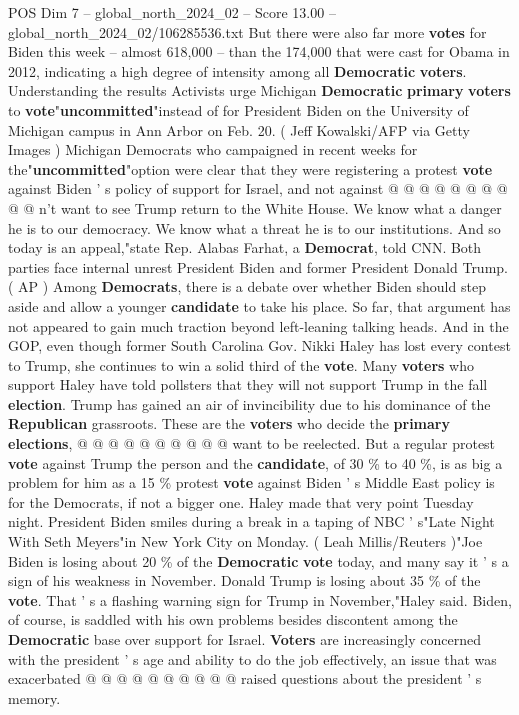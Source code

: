 \begin{textsample}{POS Dim 7 – global\_north\_2024\_02 – Score 13.00 – global\_north\_2024\_02/106285536.txt}
But there were also far more \textbf{votes} for Biden this week -- almost 618,000 -- than the 174,000 that were cast for Obama in 2012, indicating a high degree of intensity among all \textbf{Democratic} \textbf{voters}.
Understanding the results Activists urge Michigan \textbf{Democratic} \textbf{primary} \textbf{voters} to \textbf{vote}"\textbf{uncommitted}"instead of for President Biden on the University of Michigan campus in Ann Arbor on Feb. 20. ( Jeff Kowalski/AFP via Getty Images ) Michigan Democrats who campaigned in recent weeks for the"\textbf{uncommitted}"option were clear that they were registering a protest \textbf{vote} against Biden ' s policy of support for Israel, and not against @ @ @ @ @ @ @ @ @ @ n't want to see Trump return to the White House.
We know what a danger he is to our democracy.
We know what a threat he is to our institutions.
And so today is an appeal,"state Rep.
Alabas Farhat, a \textbf{Democrat}, told CNN.
Both parties face internal unrest President Biden and former President Donald Trump. ( AP ) Among \textbf{Democrats}, there is a debate over whether Biden should step aside and allow a younger \textbf{candidate} to take his place.
So far, that argument has not appeared to gain much traction beyond left-leaning talking heads.
And in the GOP, even though former South Carolina Gov.
Nikki Haley has lost every contest to Trump, she continues to win a solid third of the \textbf{vote}.
Many \textbf{voters} who support Haley have told pollsters that they will not support Trump in the fall \textbf{election}.
Trump has gained an air of invincibility due to his dominance of the \textbf{Republican} grassroots.
These are the \textbf{voters} who decide the \textbf{primary} \textbf{elections}, @ @ @ @ @ @ @ @ @ @ want to be reelected.
But a regular protest \textbf{vote} against Trump the person and the \textbf{candidate}, of 30 \% to 40 \%, is as big a problem for him as a 15 \% protest \textbf{vote} against Biden ' s Middle East policy is for the Democrats, if not a bigger one.
Haley made that very point Tuesday night.
President Biden smiles during a break in a taping of NBC ' s"Late Night With Seth Meyers"in New York City on Monday. ( Leah Millis/Reuters )"Joe Biden is losing about 20 \% of the \textbf{Democratic} \textbf{vote} today, and many say it ' s a sign of his weakness in November.
Donald Trump is losing about 35 \% of the \textbf{vote}.
That ' s a flashing warning sign for Trump in November,"Haley said.
Biden, of course, is saddled with his own problems besides discontent among the \textbf{Democratic} base over support for Israel. \textbf{Voters} are increasingly concerned with the president ' s age and ability to do the job effectively, an issue that was exacerbated @ @ @ @ @ @ @ @ @ @ raised questions about the president ' s memory.

\end{textsample}
